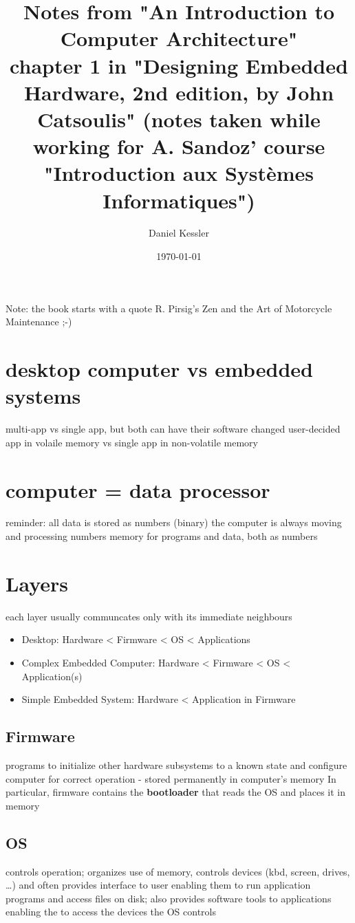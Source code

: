 \documentclass[11pt]{article}
\author{Daniel Kessler}
\date{\today}
\title{Notes from "An Introduction to Computer Architecture"\\\medskip
\large chapter 1 in "Designing Embedded Hardware, 2nd edition, by John Catsoulis" (notes taken while working for A. Sandoz' course "Introduction aux Systèmes Informatiques")}
\begin{document}
\maketitle
\tableofcontents

Note: the book starts with a quote R. Pirsig's Zen and the Art of Motorcycle Maintenance ;-)

\section{desktop computer vs embedded systems}
\label{sec:org8dbefb4}
multi-app vs single app, but both can have their software changed
user-decided app in volaile memory vs single app in non-volatile memory

\section{computer = data processor}
\label{sec:orge7a3b01}
reminder: all data is stored as numbers (binary)
the computer is always moving and processing numbers
memory for programs and data, both as numbers

\section{Layers}
\label{sec:org308dcdb}
each layer usually communcates only with its immediate neighbours
\begin{itemize}
\item Desktop: Hardware < Firmware < OS < Applications
\item Complex Embedded Computer: Hardware < Firmware < OS < Application(s)
\item Simple Embedded System: Hardware < Application in Firmware
\end{itemize}

\subsection{Firmware}
\label{sec:org82ea389}
programs to initialize other hardware subsystems to a known state and
configure computer for correct operation - stored permanently in computer's
memory
In particular, firmware contains the \textbf{bootloader} that reads the OS and places
it in memory

\subsection{OS}
\label{sec:org0947885}
controls operation; organizes use of memory, controls devices (kbd, screen,
drives, \ldots{}) and often provides interface to user enabling them to run
application programs and access files on disk; also provides software tools to
applications enabling the to access the devices the OS controls
\end{document}
